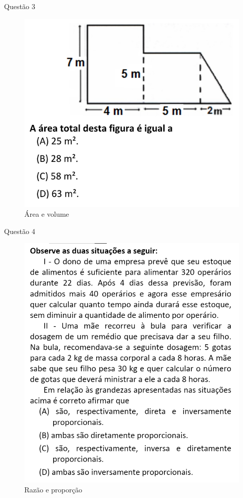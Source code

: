 \documentclass{beamer}
\begin{document}
\begin{frame}{Questão 3}
    \begin{figure}
        \caption{Área e volume}
        \includegraphics[scale=0.6]{qst19.51.png}
    \end{figure}
\end{frame}
\begin{frame}{Questão 4}
    \begin{figure}
        \caption{Razão e proporção}
        \includegraphics[scale=0.4]{qst20.14.png}
    \end{figure}
\end{frame}
\end{document}
